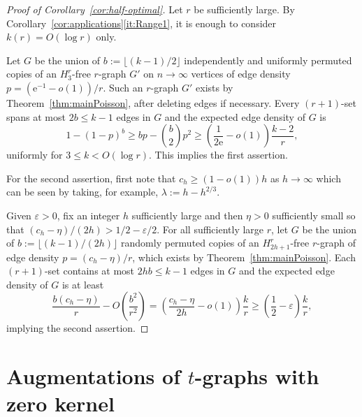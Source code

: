 \documentclass[12pt,a4paper]{article}
\numberwithin{equation}{section}
\theoremstyle{definition}
\theoremstyle{remark}
\newcommand{\hide}[1]{{\color{DarkGreen}#1}}
\renewcommand{\hide}[1]{}
\newcommand{\me}{\mathrm{e}}
\begin{document}
\begin{proof}[Proof of Corollary~\ref{cor:half-optimal}]
	Let $r$ be sufficiently large. By Corollary~\ref{cor:applications}\ref{it:Range1},
	it is enough to consider $k(r)=O(\log r)$ only.
	

	
Let $G$ be the union of $b:=\lfloor(k-1)/2\rfloor$ independently and uniformly permuted copies of an $H_3^r$-free $r$-graph $G'$ on $n\to\infty$ vertices of edge density $p=(\me^{-1}-o(1))/r$. Such an $r$-graph $G'$ exists by Theorem~\ref{thm:mainPoisson}, after deleting edges if necessary. Every $(r+1)$-set spans at most $2b\le k-1$ edges in $G$ and the expected edge density of $G$ is
	\[
	1-(1-p)^b\ge bp-\binom b2p^2
	\ge\left(\frac1{2\me}-o(1)\right)\frac{k-2}{r},
	\]
	uniformly for $3\le k<O(\log r)$. This implies the first assertion.
	
	For the second assertion, first note that $c_h\ge (1-o(1))h$ as $h\to\infty$ which can be seen by taking, for example, $\lambda:=h-h^{2/3}$. 
	\hide{The upper bound $c_h\le h$ follows from
	\[
	\lambda\mathbb P(Z\le h-1)
	=\mathbb E[Z\mathbf 1_{\{Z\le h\}}]\le h
	\quad\text{for }Z\sim\operatorname{Pois}(\lambda).
	\]

For the lower bound, let $\lambda:=h-h^{2/3}$. Chebyshev's inequality gives $\mathbb P(Z\ge h)\le\lambda/h^{4/3}\le h^{-1/3}$, so
	\[
	c_h\ge(h-h^{2/3})(1-h^{-1/3})=(1-o(1))h.
	\]
}
 Given $\varepsilon>0$, fix an integer $h$ sufficiently large and then $\eta>0$ sufficiently small so that $(c_h-\eta)/(2h)>1/2-\varepsilon/2$.
For all sufficiently large $r$, let $G$ be the union of  $b:=\lfloor(k-1)/(2h)\rfloor$ randomly permuted copies of an $H_{2h+1}^r$-free $r$-graph of edge density $p=(c_h-\eta)/r$, which exists by Theorem~\ref{thm:mainPoisson}. Each $(r+1)$-set contains at most $2hb\le k-1$ edges in $G$ and the expected edge density of $G$ is at least
	\[
	\frac{b(c_h-\eta)}r-O\left(\frac{b^2}{r^2}\right)
	=\left(\frac{c_h-\eta}{2h}-o(1)\right)\frac{k}{r}\ge \left(\frac12-\varepsilon\right)\frac{k}{r},
	\]
	implying the second assertion.
\end{proof}



\section{Augmentations of \texorpdfstring{$t$}{t}-graphs with zero kernel}\label{sec:2}
\end{document}
